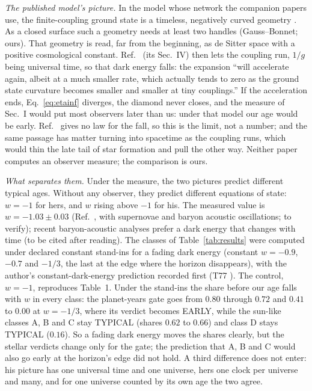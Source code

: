 \documentclass[pre,twocolumn,superscriptaddress,nofootinbib]{revtex4-2}
\begin{document}
\emph{The published model's picture.} In the model whose network the companion papers use, the finite-coupling ground
state is a timeless, negatively curved geometry \cite{T22,T23}. As a closed surface such a geometry needs at least two
handles (Gauss--Bonnet; ours). That geometry is read, far from the beginning, as de Sitter space with a positive
cosmological constant. Ref.~\cite{T24} (its Sec.~IV) then lets the coupling run, $1/g$ being universal time, so that dark
energy falls: the expansion ``will accelerate again, albeit at a much smaller rate, which actually tends to zero as the
ground state curvature becomes smaller and smaller at tiny couplings.'' If the acceleration ends, Eq.~\eqref{eq:etainf}
diverges, the diamond never closes, and the measure of Sec.~I would put most observers later than us: under that model
our age would be early. Ref.~\cite{T24} gives no law for the fall, so this is the limit, not a number; and the same
passage has matter turning into spacetime as the coupling runs, which would thin the late tail of star formation and
pull the other way. Neither paper computes an observer measure; the comparison is ours.

\emph{What separates them.} Under the measure, the two pictures predict different typical ages. Without any observer,
they predict different equations of state: $w = -1$ for hers, and $w$ rising above $-1$ for his. The measured value is
$w = -1.03 \pm 0.03$ (Ref.~\cite{Planck18}, with supernovae and baryon acoustic oscillations; to verify); recent baryon-acoustic analyses prefer a dark energy that changes with time (to be
cited after reading). The classes of Table~\ref{tab:results} were computed under declared constant stand-ins for a
fading dark energy (constant $w = -0.9$, $-0.7$ and $-1/3$, the last at the edge where the horizon disappears), with
the author's constant-dark-energy prediction recorded first (T77 \cite{repo}). The control, $w = -1$, reproduces Table~1.
Under the stand-ins the share before our age falls with $w$ in every class: the planet-years gate goes from $0.80$
through $0.72$ and $0.41$ to $0.00$ at $w = -1/3$, where its verdict becomes EARLY, while the sun-like classes A, B and C
stay TYPICAL (shares $0.62$ to $0.66$) and class D stays TYPICAL ($0.16$). So a fading dark energy moves the shares
clearly, but the stellar verdicts change only for the gate; the prediction that A, B and C would also go early at the
horizon's edge did not hold. A third difference does not enter: his
picture has one universal time and one universe, hers one clock per universe and many, and for one universe counted by
its own age the two agree.
\end{document}
